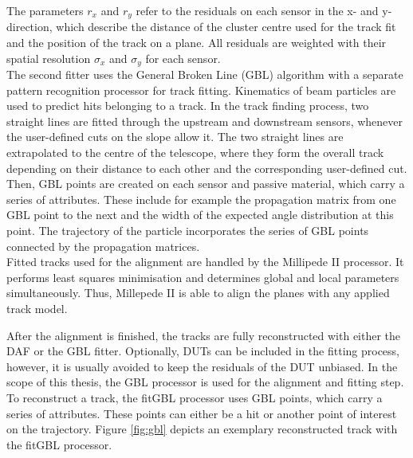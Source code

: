 The parameters $r_x$ and $r_y$ refer to the residuals on each sensor in the x- and y-direction, which describe the distance of the cluster centre used for the track fit and the
position of the track on a plane. All residuals are weighted with their spatial resolution $\sigma_x$ and $\sigma_y$ for each sensor. \\
The second fitter uses the General Broken Line (GBL) algorithm \cite{general_broken_lines}
with a separate pattern recognition processor for track fitting. Kinematics of
beam particles are used to predict hits belonging to a track. In the track finding process, two straight lines are fitted through the upstream and
downstream sensors, whenever the user-defined cuts on the slope allow it. The two straight lines are extrapolated to the centre of the telescope, where
they form the overall track depending on their distance to each other and the corresponding user-defined cut.  Then, GBL points are created on each sensor and
passive material, which
carry a series of attributes. These include for example the
propagation matrix from one GBL point to the next and the width of the expected angle distribution at this point. The trajectory of the particle incorporates the series of GBL points
connected by the propagation matrices.\\
Fitted tracks used for the alignment are handled by the Millipede II processor. It performs least squares minimisation and determines global and local
parameters simultaneously. Thus, Millepede II is able to align the planes with any applied track model.

After the alignment is finished, the tracks are fully reconstructed with either the DAF or the GBL fitter. Optionally, DUTs can be included in the fitting
process, however, it is usually avoided to keep the residuals of the DUT unbiased. In the scope of this thesis, the GBL processor is used for the
alignment and fitting step. To reconstruct a track, the fitGBL processor uses GBL points, which carry a series of attributes. These points can either be a
hit or another point of interest on the trajectory. Figure \ref{fig:gbl} depicts an exemplary reconstructed track with the fitGBL processor.

